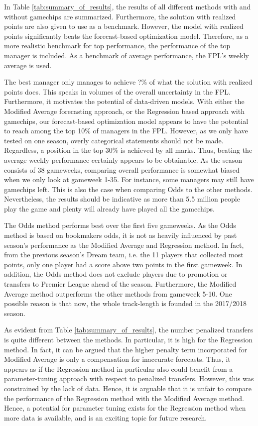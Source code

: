 In Table \ref{tab:summary_of_results}, the results of all different methods with and without gamechips are summarized. Furthermore, the solution with realized points are also given to use as a benchmark. However, the model with realized points significantly beats the forecast-based optimization model. Therefore, as a more realistic benchmark for top performance, the performance of the top manager is included. As a benchmark of average performance, the FPL's weekly average is used.

\newpar

The best manager only manages to achieve ?\% of what the solution with realized points does. This speaks in volumes of the overall uncertainty in the FPL. Furthermore, it motivates the potential of data-driven models. With either the Modified Average forecasting approach, or the Regression based approach with gamechips, our forecast-based optimization model appears to have the potential to reach among the top 10\% of managers in the FPL. However, as we only have tested on one season, overly categorical statements should not be made. Regardless, a position in the top 30\% is achieved by all marks. Thus, beating the average weekly performance certainly appears to be obtainable. As the season consists of 38 gameweeks, comparing overall performance is somewhat biased when we only look at gameweek 1-35. For instance, some managers may still have gamechips left. This is also the case when comparing Odds to the other methods. Nevertheless, the results should be indicative as more than 5.5 million people play the game and plenty will already have played all the gamechips.

\newpar

The Odds method performs best over the first five gameweeks. As the Odds method is based on bookmakers odds, it is not as heavily influenced by past season's performance as the Modified Average and Regression method. In fact, from the previous season's Dream team, i.e. the 11 players that collected most points, only one player had a score above two points in the first gameweek. In addition, the Odds method does not exclude players due to promotion or transfers to Premier League ahead of the season. Furthermore, the Modified Average method outperforms the other methods from gameweek 5-10. One possible reason is that now, the whole track-length is founded in the 2017/2018 season.

\newpar

As evident from Table \ref{tab:summary_of_results}, the number penalized transfers is quite different between the methods. In particular, it is high for the Regression method. In fact, it can be argued that the higher penalty term incorporated for Modified Average is only a compensation for inaccurate forecasts. Thus, it appears as if the Regression method in particular also could benefit from a parameter-tuning approach with respect to penalized transfers. However, this was constrained by the lack of data. Hence, it is arguable that it is unfair to compare the performance of the Regression method with the Modified Average method. Hence, a potential for parameter tuning exists for the Regression method when more data is available, and is an exciting topic for future research.

